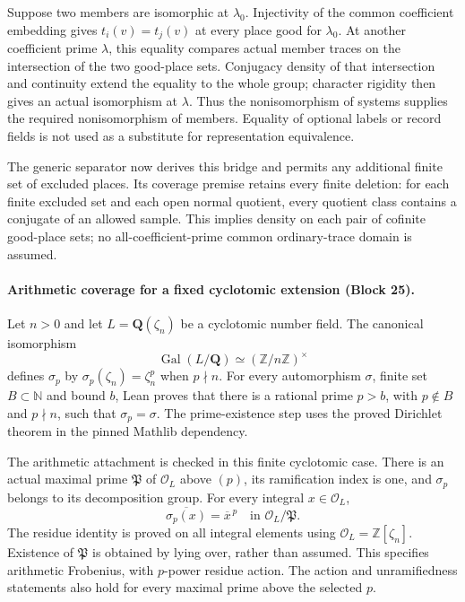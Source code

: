 \documentclass[11pt]{article}
\theoremstyle{definition}
\theoremstyle{remark}
\newcommand{\Q}{\mathbf Q}
\begin{document}
Suppose two members are isomorphic at $\lambda_0$. Injectivity of the common
coefficient embedding gives $t_i(v)=t_j(v)$ at every place good for $\lambda_0$.
At another coefficient prime $\lambda$, this equality compares actual member
traces on the intersection of the two good-place sets. Conjugacy density of
that intersection and continuity extend the equality to the whole group;
character rigidity then gives an actual isomorphism at $\lambda$.
Thus the nonisomorphism of systems supplies the required nonisomorphism of
members. Equality of optional labels or record fields is not used as a
substitute for representation equivalence.

The generic separator now derives this bridge and permits any additional finite
set of excluded places. Its coverage premise retains every finite deletion:
for each finite excluded set and each open normal quotient, every quotient
class contains a conjugate of an allowed sample. This implies density on each
pair of cofinite good-place sets; no all-coefficient-prime common ordinary-trace
domain is assumed.

\paragraph{Arithmetic coverage for a fixed cyclotomic extension (Block 25).}
Let $n>0$ and let $L=\Q(\zeta_n)$ be a cyclotomic number field. The canonical
isomorphism
\[
 \operatorname{Gal}(L/\Q)\simeq(\mathbb Z/n\mathbb Z)^\times
\]
defines $\sigma_p$ by $\sigma_p(\zeta_n)=\zeta_n^p$ when $p\nmid n$.
For every automorphism $\sigma$, finite set $B\subset\mathbb N$ and bound $b$,
Lean proves that there is a rational prime $p>b$, with $p\notin B$ and
$p\nmid n$, such that $\sigma_p=\sigma$. The prime-existence step uses the
proved Dirichlet theorem in the pinned Mathlib dependency.

The arithmetic attachment is checked in this finite cyclotomic case. There is
an actual maximal prime $\mathfrak P$ of $\mathcal O_L$ above $(p)$, its
ramification index is one, and $\sigma_p$ belongs to its decomposition group.
For every integral $x\in\mathcal O_L$,
\[
 \overline{\sigma_p(x)}=\overline{x}^{\,p}
 \quad\text{in }\mathcal O_L/\mathfrak P.
\]
The residue identity is proved on all integral elements using
$\mathcal O_L=\mathbb Z[\zeta_n]$. Existence of $\mathfrak P$ is obtained by
lying over, rather than assumed. This specifies arithmetic Frobenius, with
$p$-power residue action. The action and unramifiedness statements also hold
for every maximal prime above the selected $p$.
\end{document}
